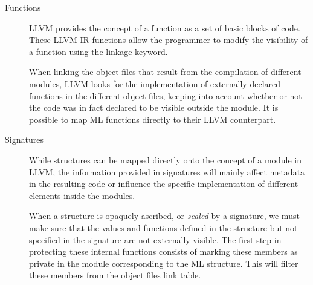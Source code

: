 \begin{description}




\item[Functions]
LLVM provides the concept of a function as a set of basic blocks of code. 
These LLVM IR functions allow the programmer to modify the visibility of a function using the linkage keyword. 

When linking the object files that result from the compilation of different modules, LLVM looks for the implementation of externally declared functions in the different object files, keeping into account whether or not the code was in fact declared to be visible outside the module. It is possible to map ML functions directly to their LLVM counterpart.

\item[Signatures]
While structures can be mapped directly onto the concept of a module in LLVM, the information provided in signatures will mainly affect metadata in the resulting code or influence the specific implementation of different elements inside the modules.

When a structure is opaquely ascribed, or \emph{sealed} by a signature, we must make sure that the values and functions defined in the structure but not specified in the signature are not externally visible. The first step in protecting these internal functions consists of marking these members as private in the module corresponding to the ML structure. This will filter these members from the object files link table. %


\end{description}
